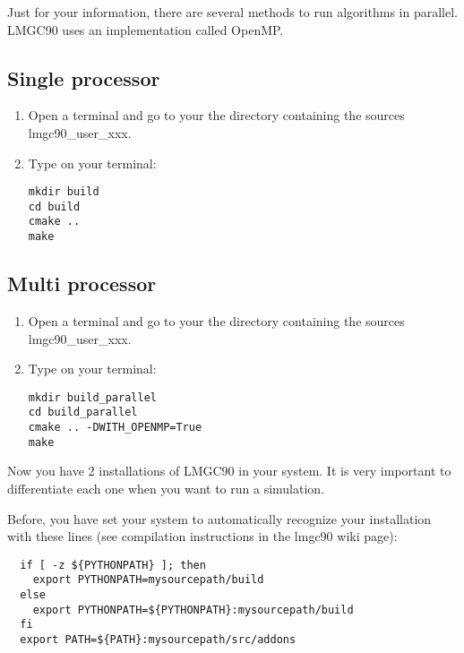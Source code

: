 \documentclass[12pt]{article}
\begin{document}
Just for your information, there are several methods to run algorithms in parallel. LMGC90 uses an implementation called OpenMP.

\subsection*{Single processor}
\begin{enumerate}
  \item Open a terminal and go to your the directory containing the sources lmgc90\_user\_xxx.
  \item Type on your terminal:
  \begin{tcolorbox}
  \texttt{mkdir build} \\
  \texttt{cd build} \\
  \texttt{cmake ..} \\
  \texttt{make}
  \end{tcolorbox}
\end{enumerate}

\subsection*{Multi processor}
\begin{enumerate}
  \item Open a terminal and go to your the directory containing the sources lmgc90\_user\_xxx.
  \item Type on your terminal:
  \begin{tcolorbox}
  \texttt{mkdir build\_parallel} \\
  \texttt{cd build\_parallel} \\
  \texttt{cmake .. -DWITH\_OPENMP=True} \\
  \texttt{make}
  \end{tcolorbox}
\end{enumerate}

Now you have 2 installations of LMGC90 in your system. 
It is very important to differentiate each one when you want to run a simulation. 

Before, you have set your system to automatically recognize your installation with these lines (see compilation instructions in the lmgc90 wiki page): 

\begin{tcolorbox}[colback=blue!10]
\begin{verbatim}
  if [ -z ${PYTHONPATH} ]; then
    export PYTHONPATH=mysourcepath/build
  else
    export PYTHONPATH=${PYTHONPATH}:mysourcepath/build
  fi
  export PATH=${PATH}:mysourcepath/src/addons
\end{verbatim}
\end{tcolorbox}
\end{document}
